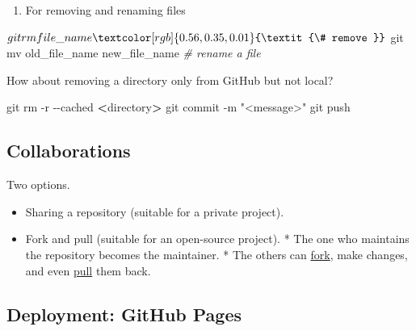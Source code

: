 \documentclass[
]{book}
\newenvironment{Shaded}{\begin{snugshade}}{\end{snugshade}}
\newcommand{\AttributeTok}[1]{\textcolor[rgb]{0.77,0.63,0.00}{#1}}
\newcommand{\CommentTok}[1]{\textcolor[rgb]{0.56,0.35,0.01}{\textit{#1}}}
\newcommand{\ExtensionTok}[1]{#1}
\newcommand{\FunctionTok}[1]{\textcolor[rgb]{0.00,0.00,0.00}{#1}}
\newcommand{\NormalTok}[1]{#1}
\newcommand{\OperatorTok}[1]{\textcolor[rgb]{0.81,0.36,0.00}{\textbf{#1}}}
\newcommand{\StringTok}[1]{\textcolor[rgb]{0.31,0.60,0.02}{#1}}
\providecommand{\tightlist}{%
  \setlength{\itemsep}{0pt}\setlength{\parskip}{0pt}}
\begin{document}
\begin{enumerate}
\def\labelenumi{\arabic{enumi}.}
\setcounter{enumi}{1}
\tightlist
\item
  For removing and renaming files
\end{enumerate}

\begin{Shaded}
\begin{Highlighting}[]
\ExtensionTok{$}\NormalTok{ git rm file\_name }\CommentTok{\# remove }
\ExtensionTok{$}\NormalTok{ git mv old\_file\_name new\_file\_name }\CommentTok{\# rename a file }
\end{Highlighting}
\end{Shaded}

How about removing a directory only from GitHub but not local?

\begin{Shaded}
\begin{Highlighting}[]
\FunctionTok{git}\NormalTok{ rm }\AttributeTok{{-}r} \AttributeTok{{-}{-}cached} \OperatorTok{\textless{}}\NormalTok{directory}\OperatorTok{\textgreater{}}
\FunctionTok{git}\NormalTok{ commit }\AttributeTok{{-}m} \StringTok{"\textless{}message\textgreater{}"}
\FunctionTok{git}\NormalTok{ push}
\end{Highlighting}
\end{Shaded}

\hypertarget{collaborations}{%
\subsection{Collaborations}\label{collaborations}}

Two options.

\begin{itemize}
\tightlist
\item
  Sharing a repository (suitable for a private project).
\item
  Fork and pull (suitable for an open-source project).
  \hspace{0pt} * The one who maintains the repository becomes the maintainer.
  \hspace{0pt} * The others can \href{https://help.GitHub.com/articles/about-forks/}{fork}, make changes, and even \href{https://help.GitHub.com/articles/about-pull-requests/}{pull} them back.
\end{itemize}

\hypertarget{deployment-github-pages}{%
\subsection{Deployment: GitHub Pages}\label{deployment-github-pages}}
\end{document}
